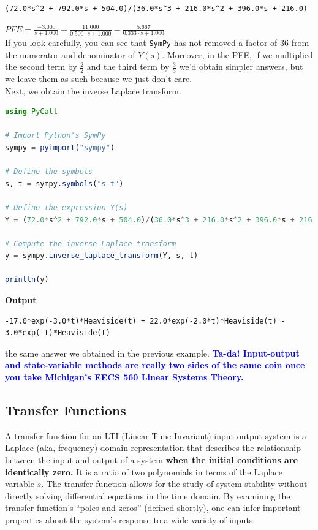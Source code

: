 \begin{verbatim}
(72.0*s^2 + 792.0*s + 504.0)/(36.0*s^3 + 216.0*s^2 + 396.0*s + 216.0)
\end{verbatim}
$PFE = \frac{-3.000}{s + 1.000} + \frac{11.000}{0.500 \cdot s + 1.000} - \frac{5.667}{0.333 \cdot s + 1.000}$\\

If you look carefully, you can see that \texttt{SymPy} has not removed a factor of 36 from the numerator and denominator of $Y(s)$. Moreover, in the PFE, if we multiplied the second term by $\frac{2}{2}$ and the third term by  $\frac{3}{3}$ we'd obtain simpler answers, but we leave them as such because we just don't care. \\

Next, we obtain the inverse Laplace transform. 

\begin{lstlisting}[language=Julia,style=mystyle]
using PyCall

# Import Python's SymPy
sympy = pyimport("sympy")

# Define the symbols
s, t = sympy.symbols("s t")

# Define the expression Y(s)
Y = (72.0*s^2 + 792.0*s + 504.0)/(36.0*s^3 + 216.0*s^2 + 396.0*s + 216.0)

# Compute the inverse Laplace transform
y = sympy.inverse_laplace_transform(Y, s, t)

println(y)
\end{lstlisting}
\textbf{Output} 
\begin{verbatim}
-17.0*exp(-3.0*t)*Heaviside(t) + 22.0*exp(-2.0*t)*Heaviside(t) - 3.0*exp(-t)*Heaviside(t)
\end{verbatim}
the same answer we obtained in the previous example. \textcolor{blue}{\bf Ta-da! Input-output and state-variable methods are really two sides of the same coin once you take Michigan's EECS 560 Linear Systems Theory.}
\vspace*{.2cm}


\subsection{Transfer Functions}

A transfer function for an LTI (Linear Time-Invariant) input-output system is a Laplace (aka, frequency) domain representation that describes the relationship between the input and output of a system \textbf{when the initial conditions are identically zero.} It is a ratio of two polynomials in terms of the Laplace variable \( s \). The transfer function allows for the study of system stability without directly solving differential equations in the time domain. By examining the transfer function's ``poles and zeros'' (defined shortly), one can infer important properties about the system's response to a wide variety of inputs.

